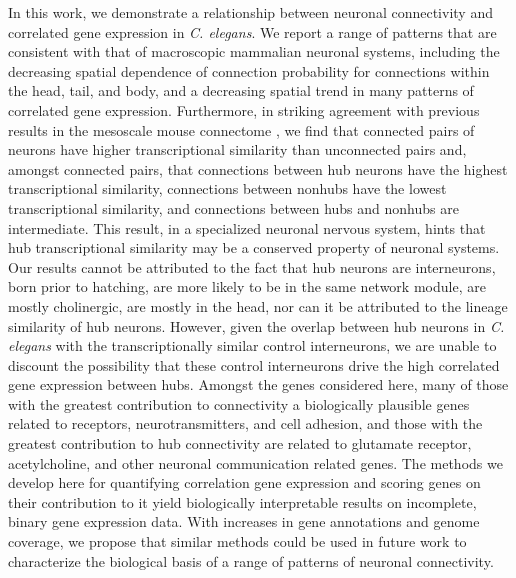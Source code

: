 \documentclass[10pt,letterpaper]{article}
\begin{document}
{In this work, we demonstrate a relationship between neuronal connectivity and correlated gene expression in \textit{C. elegans}.
We report a range of patterns that are consistent with that of macroscopic mammalian neuronal systems, including the decreasing spatial dependence of connection probability for connections within the head, tail, and body, and a decreasing spatial trend in many patterns of correlated gene expression.
Furthermore, in striking agreement with previous results in the mesoscale mouse connectome \cite{Fulcher:2016ck}, we find that connected pairs of neurons have higher transcriptional similarity than unconnected pairs and, amongst connected pairs, that connections between hub neurons have the highest transcriptional similarity, connections between nonhubs have the lowest transcriptional similarity, and connections between hubs and nonhubs are intermediate.
This result, in a specialized neuronal nervous system, hints that hub transcriptional similarity may be a conserved property of neuronal systems.
Our results cannot be attributed to the fact that hub neurons are interneurons, born prior to hatching, are more likely to be in the same network module, are mostly cholinergic, are mostly in the head, nor can it be attributed to the lineage similarity of hub neurons.
However, given the overlap between hub neurons in \emph{C. elegans} with the transcriptionally similar control interneurons, we are unable to discount the possibility that these control interneurons drive the high correlated gene expression between hubs.
Amongst the genes considered here, many of those with the greatest contribution to connectivity a biologically plausible genes related to receptors, neurotransmitters, and cell adhesion, and those with the greatest contribution to hub connectivity are related to glutamate receptor, acetylcholine, and other neuronal communication related genes.
The methods we develop here for quantifying correlation gene expression and scoring genes on their contribution to it yield biologically interpretable results on incomplete, binary gene expression data.
With increases in gene annotations and genome coverage, we propose that similar methods could be used in future work to characterize the biological basis of a range of patterns of neuronal connectivity.

}
\end{document}
